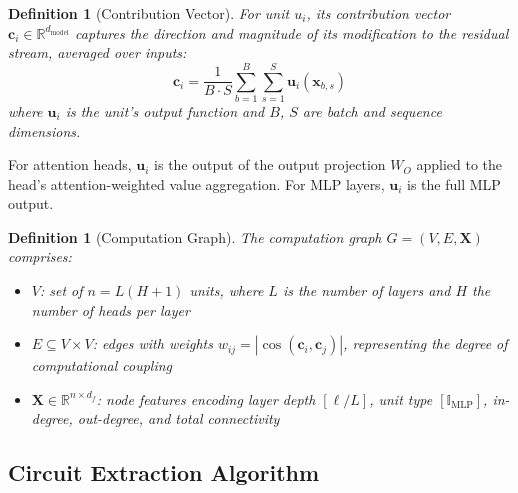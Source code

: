 \documentclass[11pt,a4paper]{article}
\newtheorem{definition}[theorem]{Definition}
\begin{document}
\begin{definition}[Contribution Vector]
For unit $u_i$, its \emph{contribution vector} $\mathbf{c}_i \in \mathbb{R}^{d_{\text{model}}}$ captures the direction and magnitude of its modification to the residual stream, averaged over inputs:
\begin{equation}
\mathbf{c}_i = \frac{1}{B \cdot S} \sum_{b=1}^{B} \sum_{s=1}^{S} \mathbf{u}_i(\mathbf{x}_{b,s})
\end{equation}
where $\mathbf{u}_i$ is the unit's output function and $B$, $S$ are batch and sequence dimensions.
\end{definition}

For attention heads, $\mathbf{u}_i$ is the output of the output projection $W_O$ applied to the head's attention-weighted value aggregation. For MLP layers, $\mathbf{u}_i$ is the full MLP output.

\begin{definition}[Computation Graph]
The \emph{computation graph} $G = (V, E, \mathbf{X})$ comprises:
\begin{itemize}[leftmargin=*]
    \item $V$: set of $n = L(H+1)$ units, where $L$ is the number of layers and $H$ the number of heads per layer
    \item $E \subseteq V \times V$: edges with weights $w_{ij} = |\cos(\mathbf{c}_i, \mathbf{c}_j)|$, representing the degree of computational coupling
    \item $\mathbf{X} \in \mathbb{R}^{n \times d_f}$: node features encoding layer depth $[\ell/L]$, unit type $[\mathbb{I}_{\text{MLP}}]$, in-degree, out-degree, and total connectivity
\end{itemize}
\end{definition}

\subsection{Circuit Extraction Algorithm}
\end{document}
